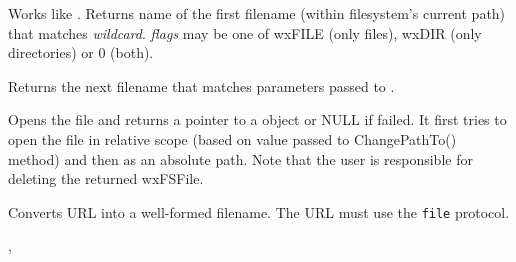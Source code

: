 




\label{wxfilesystemfindfirst}


Works like . Returns name of the first
filename (within filesystem's current path) that matches {\it wildcard}. {\it flags} may be one of
wxFILE (only files), wxDIR (only directories) or 0 (both).


\label{wxfilesystemfindnext}


Returns the next filename that matches parameters passed to .


\label{wxfilesystemopenfile}


Opens the file and returns a pointer to a  object
or NULL if failed. It first tries to open the file in relative scope
(based on value passed to ChangePathTo() method) and then as an
absolute path.  Note that the user is responsible for deleting the returned
wxFSFile.  


\label{wxfilesystemurltofilename}


Converts URL into a well-formed filename. The URL must use the {\tt file} 
protocol.


, 

